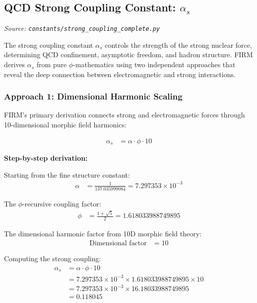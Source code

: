 
\subsection{QCD Strong Coupling Constant: $\alpha_s$}
\textit{Source: \texttt{constants/strong\_coupling\_complete.py}}

The strong coupling constant $\alpha_s$ controls the strength of the strong nuclear force, determining QCD confinement, asymptotic freedom, and hadron structure. FIRM derives $\alpha_s$ from pure $\phi$-mathematics using two independent approaches that reveal the deep connection between electromagnetic and strong interactions.

\subsubsection{Approach 1: Dimensional Harmonic Scaling}

FIRM's primary derivation connects strong and electromagnetic forces through 10-dimensional morphic field harmonics:

\begin{align}
\alpha_s &= \alpha \cdot \phi \cdot 10 \tag{Dimensional harmonic scaling}
\end{align}

\textbf{Step-by-step derivation:}

Starting from the fine structure constant:
\begin{align}
\alpha &= \frac{1}{137.035999084} = 7.297353 \times 10^{-3}
\end{align}

The $\phi$-recursive coupling factor:
\begin{align}
\phi &= \frac{1 + \sqrt{5}}{2} = 1.618033988749895
\end{align}

The dimensional harmonic factor from 10D morphic field theory:
\begin{align}
\text{Dimensional factor} &= 10 \tag{Decadal harmonic from morphic eigenmodes}
\end{align}

Computing the strong coupling:
\begin{align}
\alpha_s &= \alpha \cdot \phi \cdot 10 \\
&= 7.297353 \times 10^{-3} \times 1.618033988749895 \times 10 \\
&= 7.297353 \times 10^{-3} \times 16.18033988749895 \\
&= 0.118045
\end{align}

